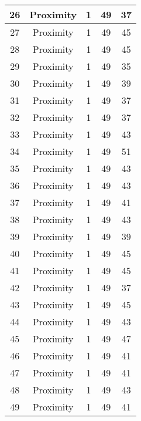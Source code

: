 \documentclass[results.tex]{subfiles}
\begin{document}
\begin{center}
\begin{tabular}{| c || c | c | c | c |}
    \hline
    26 & Proximity & 1 & 49 & 37 \\ 
    \hline
    27 & Proximity & 1 & 49 & 45 \\ 
    \hline
    28 & Proximity & 1 & 49 & 45 \\ 
    \hline
    29 & Proximity & 1 & 49 & 35 \\ 
    \hline
    30 & Proximity & 1 & 49 & 39 \\ 
    \hline
    31 & Proximity & 1 & 49 & 37 \\ 
    \hline
    32 & Proximity & 1 & 49 & 37 \\ 
    \hline
    33 & Proximity & 1 & 49 & 43 \\ 
    \hline
    34 & Proximity & 1 & 49 & 51 \\ 
    \hline
    35 & Proximity & 1 & 49 & 43 \\ 
    \hline
    36 & Proximity & 1 & 49 & 43 \\ 
    \hline
    37 & Proximity & 1 & 49 & 41 \\ 
    \hline
    38 & Proximity & 1 & 49 & 43 \\ 
    \hline
    39 & Proximity & 1 & 49 & 39 \\ 
    \hline
    40 & Proximity & 1 & 49 & 45 \\ 
    \hline
    41 & Proximity & 1 & 49 & 45 \\ 
    \hline
    42 & Proximity & 1 & 49 & 37 \\ 
    \hline
    43 & Proximity & 1 & 49 & 45 \\ 
    \hline
    44 & Proximity & 1 & 49 & 43 \\ 
    \hline
    45 & Proximity & 1 & 49 & 47 \\ 
    \hline
    46 & Proximity & 1 & 49 & 41 \\ 
    \hline
    47 & Proximity & 1 & 49 & 41 \\ 
    \hline
    48 & Proximity & 1 & 49 & 43 \\ 
    \hline
    49 & Proximity & 1 & 49 & 41 \\ 
    \hline   \end{tabular}
\end{center}
\end{document}
